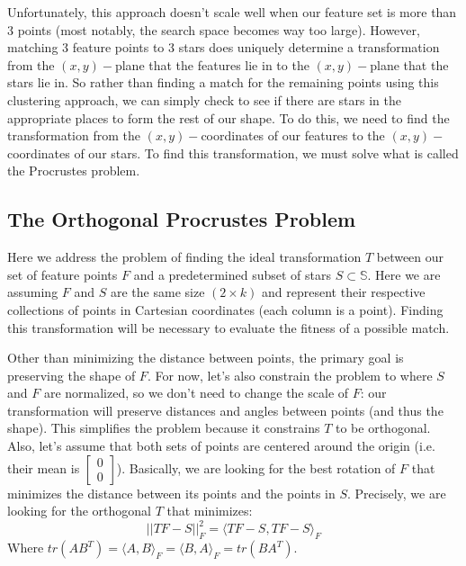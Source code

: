 \documentclass[paper=a4, fontsize=11pt]{scrartcl} %
\begin{document}

Unfortunately, this approach doesn't scale well when our feature set is more than 3 points (most notably, the search space becomes way too large). However, matching 3 feature points to 3 stars does uniquely determine a transformation from the $(x,y)-$plane that the features lie in to the $(x,y)-$plane that the stars lie in. So rather than finding a match for the remaining points using this clustering approach, we can simply check to see if there are stars in the appropriate places to form the rest of our shape. To do this, we need to find the transformation from the $(x,y)-$coordinates of our features to the $(x,y)-$coordinates of our stars. To find this transformation, we must solve what is called the Procrustes problem.


\subsection{The Orthogonal Procrustes Problem\cite{Everson1997}}
Here we address the problem of finding the ideal transformation $T$ between our set of feature points $F$ and a predetermined subset of stars $S\subset \mathbb{S}$. Here we are assuming $F$ and $S$ are the same size $(2\times k)$ and represent their respective collections of points in Cartesian coordinates (each column is a point).  Finding this transformation will be necessary to evaluate the fitness of a possible match.

Other than minimizing the distance between points, the primary goal is preserving the shape of $F$. For now, let's also constrain the problem to where $S$ and $F$ are normalized, so we don't need to change the scale of $F$: our transformation will preserve distances and angles between points (and thus the shape). This simplifies the problem because it constrains $T$ to be orthogonal. Also, let's assume that both sets of points are centered around the origin (i.e. their mean is $\begin{bmatrix}
0\\
0
\end{bmatrix}$). Basically, we are looking for the best rotation of $F$ that minimizes the distance between its points and the points in $S$. Precisely, we are looking for the orthogonal $T$ that minimizes: 
$$||TF-S||^2_F = \langle TF-S, TF-S\rangle_F$$
Where $tr(AB^T) = \langle A,B\rangle_F = \langle B,A\rangle_F = tr(BA^T)$.
\end{document}
